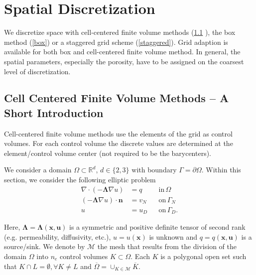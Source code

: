 
\section{Spatial Discretization}
\label{spatialdiscretization}

We discretize space with cell-centered finite volume methods (\ref{cc} ), the box method (\ref{box})
or a staggered grid scheme (\ref{staggered}).
Grid adaption is available for both box and cell-centered finite volume method.
In general, the spatial  parameters, especially the porosity, have to be assigned on
the coarsest level of discretization.
%
\subsection{Cell Centered Finite Volume Methods -- A Short Introduction}\label{cc}
Cell-centered finite volume methods use the elements of the grid as control volumes.
For each control volume the discrete values are determined at the element/control
volume center (not required to be the barycenters).

We consider a domain $\Omega \subset \mathbb{R}^d$, $d \in \{ 2, 3 \}$ with boundary $\Gamma = \partial \Omega$. Within this section, we consider the following elliptic problem
\begin{equation}
  \begin{aligned}
                   \nabla \cdot \left( - \mathbf{\Lambda} \nabla u \right) &= q   &&\mathrm{in} \, \Omega \\
               \left( - \mathbf{\Lambda} \nabla u \right) \cdot \mathbf{n} &= v_N &&\mathrm{on} \, \Gamma_N \\
                                                                   u &= u_D &&\mathrm{on} \, \Gamma_D.
    \label{eq:elliptic}
  \end{aligned}
\end{equation}

Here, $\mathbf{\Lambda} = \mathbf{\Lambda}(\mathbf{x}, \mathbf{u})$ is a symmetric and positive definite tensor of second rank (e.g. permeability, diffusivity, etc.), $u = u (\mathbf{x})$ is unknown and $q = q(\mathbf{x}, \mathbf{u})$ is a source/sink.
We denote by $\mathcal{M}$ the mesh that results from the division of the domain $\Omega$ into $n_e$ control volumes $K \subset \Omega$. Each $K$ is a polygonal open set such that $K \cap L = \emptyset, \forall{K \neq L}$ and $\overline{\Omega} = \cup_{K \in \mathcal{M}} \overline{K}$.

